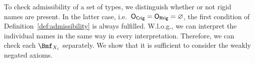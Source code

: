 To check admissibility of a set of types, we distinguish whether or not rigid names are present. In
the latter case, i.e.\ $\mathsf{O_{Crig}}=\mathsf{O_{Rrig}}=\varnothing$, the first condition of
Definition~\ref{def:admissibility} is always fulfilled. W.l.o.g., we can interpret the individual
names in the same way in every interpretation. Therefore, we can check each $\Bmf_{X_{i}}$ separately. We
show that it is sufficient to consider the weakly negated axioms.



